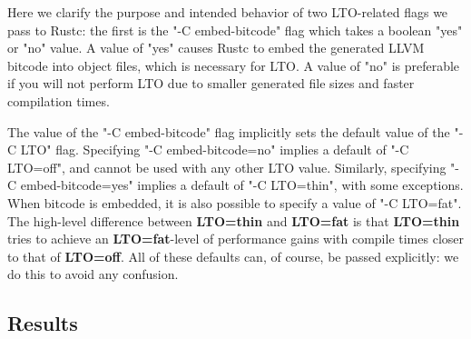 \documentclass{article}
\begin{document}
Here we clarify the purpose and intended behavior of two LTO-related flags we pass to Rustc: the first is the "-C embed-bitcode" flag which takes a boolean "yes" or "no" value. 
%
A value of "yes" causes Rustc to embed the generated LLVM bitcode into object files, which is necessary for LTO.
%
A value of "no" is preferable if you will not perform LTO due to smaller generated file sizes and faster compilation times. 

The value of the "-C embed-bitcode" flag implicitly sets the default value of the "-C LTO" flag. 
%
Specifying "-C embed-bitcode=no" implies a default of "-C LTO=off", and cannot be used with any other LTO value. 
%
Similarly, specifying "-C embed-bitcode=yes" implies a default of "-C LTO=thin", with some exceptions.
%
When bitcode is embedded, it is also possible to specify a value of "-C LTO=fat". 
%
The high-level difference between \textbf{LTO=thin} and \textbf{LTO=fat} is that \textbf{LTO=thin} tries to achieve an \textbf{LTO=fat}-level of performance gains with compile times closer to that of \textbf{LTO=off}. 
%
All of these defaults can, of course, be passed explicitly: we do this to avoid any confusion. 

\subsection{Results}
\label{sec:results}
\medskip
\end{document}
